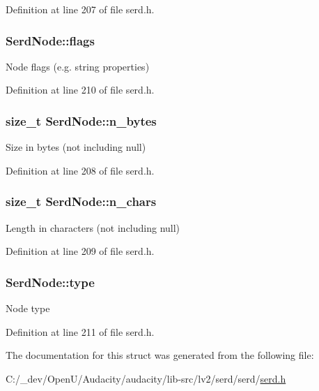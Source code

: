Definition at line 207 of file serd.\+h.

\subsubsection[{\texorpdfstring{flags}{flags}}]{ Serd\+Node\+::flags}\hypertarget{struct_serd_node_a945891f8a5762a5739fc6ad7e023b50c}{}\label{struct_serd_node_a945891f8a5762a5739fc6ad7e023b50c}
Node flags (e.\+g. string properties) 

Definition at line 210 of file serd.\+h.

\subsubsection[{\texorpdfstring{n\+\_\+bytes}{n_bytes}}]{\setlength{\rightskip}{0pt plus 5cm}size\+\_\+t Serd\+Node\+::n\+\_\+bytes}\hypertarget{struct_serd_node_a64b294c408ae9387ffaa78a742196985}{}\label{struct_serd_node_a64b294c408ae9387ffaa78a742196985}
Size in bytes (not including null) 

Definition at line 208 of file serd.\+h.

\subsubsection[{\texorpdfstring{n\+\_\+chars}{n_chars}}]{\setlength{\rightskip}{0pt plus 5cm}size\+\_\+t Serd\+Node\+::n\+\_\+chars}\hypertarget{struct_serd_node_ad4816721933bbd19f904ff67d3beb40e}{}\label{struct_serd_node_ad4816721933bbd19f904ff67d3beb40e}
Length in characters (not including null) 

Definition at line 209 of file serd.\+h.

\subsubsection[{\texorpdfstring{type}{type}}]{ Serd\+Node\+::type}\hypertarget{struct_serd_node_ac415ada00df1883e7200cfa5c89b7fb9}{}\label{struct_serd_node_ac415ada00df1883e7200cfa5c89b7fb9}
Node type 

Definition at line 211 of file serd.\+h.



The documentation for this struct was generated from the following file\+:\begin{DoxyCompactItemize}
\item 
C\+:/\+\_\+dev/\+Open\+U/\+Audacity/audacity/lib-\/src/lv2/serd/serd/\hyperlink{serd_8h}{serd.\+h}\end{DoxyCompactItemize}
